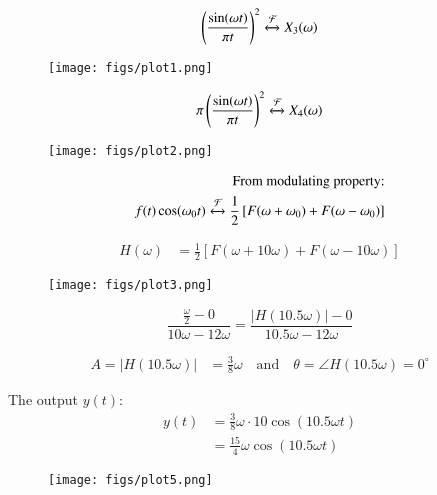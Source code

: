 \documentclass[journal,12pt,twocolumn]{IEEEtran}
\begin{document}
\begin{align}
\left(\frac{\sin(\omega t)}{\pi t}\right)^2  \xleftrightarrow{\mathcal{F}} X_3(\omega) 
\end{align}
\begin{figure}[h!]
    \centering
    \texttt{[image: figs/plot1.png]}
    \caption{}
    \label{fig:sr11}
\end{figure}
\begin{align}
\pi\left(\frac{\sin(\omega t)}{\pi t}\right)^2 \xleftrightarrow{\mathcal{F}} X_4(\omega)
\end{align}
\begin{figure}[h!]
    \centering
    \texttt{[image: figs/plot2.png]}
    \caption{}
    \label{fig:sr12}
\end{figure}
    \begin{align}
\text{From modulating property:} \nonumber \\
        f(t) \cos(\omega_0 t) \xleftrightarrow{\mathcal{F}} \frac{1}{2} \left[F(\omega + \omega_0) + F(\omega - \omega_0)\right]
    \end{align}

    \begin{align}
        H(\omega) &= \frac{1}{2} \left[F(\omega + 10\omega) + F(\omega - 10\omega)\right]
    \end{align}

\begin{figure}[h!]
    \centering
    \texttt{[image: figs/plot3.png]}
    \caption{}
    \label{fig:sr13}
\end{figure}
\begin{equation}
    \frac{\frac{\omega}{2} - 0}{10\omega - 12\omega} = \frac{|H(10.5\omega)| - 0}{10.5\omega - 12\omega}
\end{equation}

\begin{align}
A = |H(10.5\omega)| &= \frac{3}{8}\omega \quad \text{and} \quad  \theta= \angle H(10.5\omega) = 0^\circ
\end{align}

The output \(y(t)\):
\begin{align}
y(t) &= \frac{3}{8}\omega \cdot 10 \cos(10.5 \omega t) \\
&= \frac{15}{4}\omega \cos(10.5 \omega t)
\end{align}
\begin{figure}[h!]
    \centering
    \texttt{[image: figs/plot5.png]}
    \caption{}
    \label{fig:sr14}
\end{figure}
\end{document}
